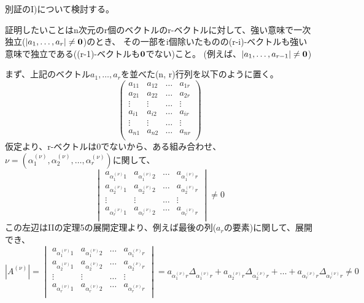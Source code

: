 \documentclass{jsarticle}
\begin{document}
別証のI)について検討する。

証明したいことはn次元のr個のベクトルのr-ベクトルに対して、強い意味で一次独立($|a_1, \hdots, a_r| \neq \bf{0}$)のとき、
その一部をi個除いたものの(r-i)-ベクトルも強い意味で独立である((r-1)-ベクトルも$\bf{0}$でない)こと。
(例えば、$|a_1, \hdots, a_{r-1}| \neq \bf{0}$)

まず、上記のベクトル$a_1, \hdots, a_r$を並べた(n, r)行列を以下のように置く。
\begin{equation}
	\begin{pmatrix}
		a_{11} & a_{12} & \hdots & a_{1r} \\
		a_{21} & a_{22} & \hdots & a_{2r} \\
		\vdots & \vdots & \hdots & \vdots \\
		a_{i1} & a_{i2} & \hdots & a_{ir} \\
		\vdots & \vdots & \hdots & \vdots \\
		a_{n1} & a_{n2} & \hdots & a_{nr} \\
	\end{pmatrix}
\end{equation}
仮定より、r-ベクトルは0でないから、ある組み合わせ、$\nu = (\alpha_1^{(\nu)}, \alpha_2^{(\nu)}, \hdots, \alpha_r^{(\nu)})$に関して、
\begin{equation}
	\begin{vmatrix}
		a_{\alpha_1^{(\nu)}1} & a_{\alpha_1^{(\nu)}2} & \hdots & a_{\alpha_1^{(\nu)}r} \\
		a_{\alpha_2^{(\nu)}1} & a_{\alpha_2^{(\nu)}2} & \hdots & a_{\alpha_2^{(\nu)}r} \\
		\vdots & \vdots & \hdots & \vdots \\
		a_{\alpha_r^{(\nu)}1} & a_{\alpha_r^{(\nu)}2} & \hdots & a_{\alpha_r^{(\nu)}r} \\
	\end{vmatrix} \neq 0
\end{equation}
この左辺はIIの定理5の展開定理より、例えば最後の列($a_r$の要素)に関して、展開でき、
\begin{equation}
	\label{det}
	|A^{(\nu)}| = 
	\begin{vmatrix}
		a_{\alpha_1^{(\nu)}1} & a_{\alpha_1^{(\nu)}2} & \hdots & a_{\alpha_1^{(\nu)}r} \\
		a_{\alpha_2^{(\nu)}1} & a_{\alpha_2^{(\nu)}2} & \hdots & a_{\alpha_2^{(\nu)}r} \\
		\vdots & \vdots & \hdots & \vdots \\
		a_{\alpha_r^{(\nu)}1} & a_{\alpha_r^{(\nu)}2} & \hdots & a_{\alpha_r^{(\nu)}r} \\
	\end{vmatrix}
	=
	a_{\alpha_1^{(\nu)}r}\Delta_{\alpha_1^{(\nu)}r} + a_{\alpha_2^{(\nu)}r}\Delta_{\alpha_2^{(\nu)}r} + \hdots + a_{\alpha_r^{(\nu)}r}\Delta_{\alpha_r^{(\nu)}r}
	\neq 0
\end{equation}
\end{document}

